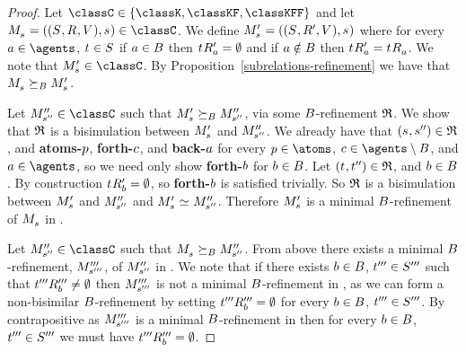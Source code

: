 \begin{proof}
Let $\classC \in \{\classK, \classKF, \classKFF\}$ and let $\kPModelAndTuple{\kStateS} \in \classC$.
We define $\kPModelP{\kStateS} = ((\kStates, \kAccessibilityP{}, \kValuation), \kStateS)$ where for every $\agentA \in \agents$, $\kStateT \in \kStates$ if $a \in B$ then $\kSuccessorsPA{\kStateT} = \emptyset$ and if $a \notin B$ then $\kSuccessorsPA{\kStateT} = \kSuccessorsA{\kStateT}$.
We note that $\kPModelP{\kStateS} \in \classC$.
By Proposition~\ref{subrelations-refinement} we have that $\kPModel{\kStateS} \simulatesBs \kPModelP{\kStateS}$.

Let $\kPModelPP{\kStateSPP} \in \classC$ such that $\kPModelP{\kStateS} \simulatesBs \kPModelPP{\kStateSPP}$, via some $B$-refinement $\mathfrak{R}$.
We show that $\mathfrak{R}$ is a bisimulation between $\kPModelP{\kStateS}$ and ${M^{\prime\prime}_{{s}^{\prime\prime}}}$.
We already have that $(\kStateS, \kStateSPP) \in \refinement$, and {\bf atoms-$p$}, {\bf forth-$c$}, and {\bf back-$a$} for every $\atomP \in \atoms$, $\agentC \in \agents \setminus \agentsB$, and $\agentA \in \agents$, so we need only show {\bf forth-$b$} for $b \in B$.
Let $(\kStateT, \kStateTPP) \in \refinement$, and $b \in B$.
By construction $\kSuccessorsPB{\kStateT} = \emptyset$, so {\bf forth-$b$} is satisfied trivially.
So $\mathfrak{R}$ is a bisimulation between $\kPModelP{\kStateS}$ and ${M^{\prime\prime}_{{s}^{\prime\prime}}}$ and $\kPModelP{\kStateS} \bisimilar \kPModelPP{\kStateSPP}$.
Therefore $\kPModelP{\kStateS}$ is a minimal $B$-refinement of $\kPModel{\kStateS}$ in \classC{}.


Let $\kPModelPP{\kStateSPP} \in \classC$ such that $\kPModel{\kStateS} \simulatesBs \kPModelPP{\kStateSPP}$.
From above there exists a minimal $B$-refinement, ${M^{\prime\prime\prime}_{{s}^{\prime\prime\prime}}}$, of ${M^{\prime\prime}_{{s}^{\prime\prime}}}$ in \classC{}.
We note that if there exists $b \in B$, ${t}^{\prime\prime\prime} \in {S^{\prime\prime\prime}}$ such that ${{t}^{\prime\prime\prime}} {R^{\prime\prime\prime}_{b}} \neq \emptyset$ then ${M^{\prime\prime\prime}_{{s}^{\prime\prime\prime}}}$ is not a minimal $B$-refinement in \classC{}, as we can form a non-bisimilar $B$-refinement by setting ${{t}^{\prime\prime\prime}} {R^{\prime\prime\prime}_{b}} = \emptyset$ for every $b \in B$, ${t}^{\prime\prime\prime} \in {S^{\prime\prime\prime}}$.
By contrapositive as ${M^{\prime\prime\prime}_{{s}^{\prime\prime\prime}}}$ is a minimal $B$-refinement in \classC{} then for every $b \in B$, ${t}^{\prime\prime\prime} \in {S^{\prime\prime\prime}}$ we must have ${{t}^{\prime\prime\prime}} {R^{\prime\prime\prime}_{b}} = \emptyset$.


\end{proof}
